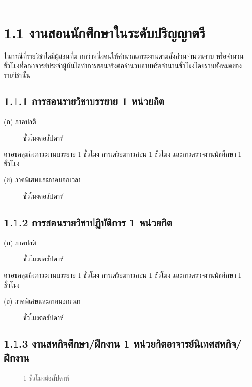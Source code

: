 \documentclass[a4paper,12pt,english]{sphinxmanual}
\begin{document}
\bigskip\hrule\bigskip



\section{1.1 งานสอนนักศึกษาในระดับปริญญาตรี}
\label{\detokenize{1teaching:id2}}
ในกรณีที่รายวิชาใดมีผู้สอนที่มากกว่าหนึ่งคนให้คำนวณภาระงานตามสัดส่วนจำนวนคาบ หรือจำนวนชั่วโมงที่คณาจารย์ประจำผู้นั้นได้ทำการสอนจริงต่อจำนวนคาบหรือจำนวนชั่วโมงโดยรวมทั้งหมดของรายวิชานั้น


\subsection{1.1.1 การสอนรายวิชาบรรยาย 1 หน่วยกิต}
\label{\detokenize{1teaching:id3}}\begin{description}
\item[{(ก) ภาคปกติ}]  ชั่วโมงต่อสัปดาห์

\end{description}

ครอบคลุมถึงภาระงานบรรยาย 1 ชั่วโมง การเตรียมการสอน 1 ชั่วโมง และการตรวจงานนักศึกษา 1 ชั่วโมง
\begin{description}
\item[{(ข) ภาคพิเศษและภาคนอกเวลา}]  ชั่วโมงต่อสัปดาห์

\end{description}


\subsection{1.1.2 การสอนรายวิชาปฏิบัติการ 1 หน่วยกิต}
\label{\detokenize{1teaching:id4}}\begin{description}
\item[{(ก) ภาคปกติ}]  ชั่วโมงต่อสัปดาห์

\end{description}

ครอบคลุมถึงภาระงานบรรยาย 1 ชั่วโมง การเตรียมการสอน 1 ชั่วโมง และการตรวจงานนักศึกษา 1 ชั่วโมง
\begin{description}
\item[{(ข) ภาคพิเศษและภาคนอกเวลา}]  ชั่วโมงต่อสัปดาห์

\end{description}


\subsection{1.1.3 งานสหกิจศึกษา/ฝึกงาน 1 หน่วยกิตอาจารย์นิเทศสหกิจ/ฝึกงาน}
\label{\detokenize{1teaching:id5}}\begin{quote}

1 ชั่วโมงต่อสัปดาห์
\end{quote}
\end{document}
